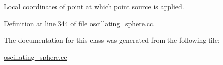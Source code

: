 Local coordinates of point at which point source is applied. 



Definition at line 344 of file oscillating\+\_\+sphere.\+cc.



The documentation for this class was generated from the following file\+:\begin{DoxyCompactItemize}
\item 
\hyperlink{oscillating__sphere_8cc}{oscillating\+\_\+sphere.\+cc}\end{DoxyCompactItemize}
